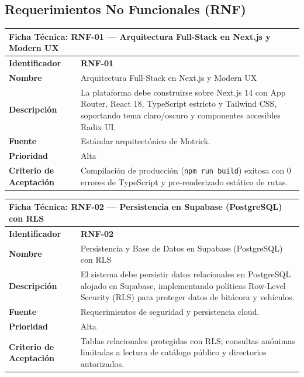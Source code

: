 \documentclass[11pt,letterpaper]{article}
\begin{document}
\subsection{Requerimientos No Funcionales (RNF)}

\begin{table}[h!]
\centering
\small
\begin{tabularx}{\textwidth}{p{3.5cm}X}
\toprule
\multicolumn{2}{l}{\textbf{\color{darkblue}Ficha Técnica: RNF-01 — Arquitectura Full-Stack en Next.js y Modern UX}} \\
\midrule
\textbf{Identificador} & \textbf{RNF-01} \\
\textbf{Nombre} & Arquitectura Full-Stack en Next.js y Modern UX \\
\textbf{Descripción} & La plataforma debe construirse sobre Next.js 14 con App Router, React 18, TypeScript estricto y Tailwind CSS, soportando tema claro/oscuro y componentes accesibles Radix UI. \\
\textbf{Fuente} & Estándar arquitectónico de Motrick. \\
\textbf{Prioridad} & Alta \\
\textbf{Criterio de Aceptación} & Compilación de producción (\texttt{npm run build}) exitosa con 0 errores de TypeScript y pre-renderizado estático de rutas. \\
\bottomrule
\end{tabularx}
\end{table}

\begin{table}[h!]
\centering
\small
\begin{tabularx}{\textwidth}{p{3.5cm}X}
\toprule
\multicolumn{2}{l}{\textbf{\color{darkblue}Ficha Técnica: RNF-02 — Persistencia en Supabase (PostgreSQL) con RLS}} \\
\midrule
\textbf{Identificador} & \textbf{RNF-02} \\
\textbf{Nombre} & Persistencia y Base de Datos en Supabase (PostgreSQL) con RLS \\
\textbf{Descripción} & El sistema debe persistir datos relacionales en PostgreSQL alojado en Supabase, implementando políticas Row-Level Security (RLS) para proteger datos de bitácora y vehículos. \\
\textbf{Fuente} & Requerimientos de seguridad y persistencia cloud. \\
\textbf{Prioridad} & Alta \\
\textbf{Criterio de Aceptación} & Tablas relacionales protegidas con RLS; consultas anónimas limitadas a lectura de catálogo público y directorios autorizados. \\
\bottomrule
\end{tabularx}
\end{table}
\end{document}
